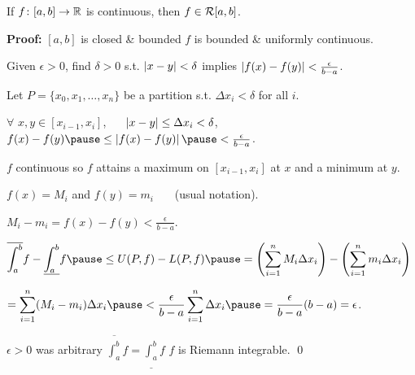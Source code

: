 \documentclass[10pt,aspectratio=149]{beamer}
\begin{document}
\begin{frame}

\begin{lemma}
If $f \colon [a,b] \to {\mathbb{R}}$ is continuous,
then $f \in {\mathcal{R}}[a,b]$.
\end{lemma}

\pause
\textbf{Proof:}
$[a,b]$ is closed \& bounded
\pause
\hfill\thus\hfill $f$ is bounded \&
uniformly continuous.

\pause
Given $\epsilon > 0$, find $\delta > 0$ s.t.
$\left\lvert {x-y} \right\rvert < \delta$ implies $\left\lvert {f(x)-f(y)} \right\rvert < \frac{\epsilon}{b-a}$.

\pause
Let $P = \{ x_0, x_1, \ldots, x_n \}$
be a partition s.t. $\Delta x_i < \delta$ for all $i$.


\pause
\medskip

$\forall$ $x, y \in [x_{i-1},x_i]$, ~~
$\left\lvert {x-y} \right\rvert \leq \Delta x_i < \delta$,
\pause
\wthus
$
f(x)-f(y)
\pause
\leq
\abs{f(x)-f(y)}
\pause
<
\frac{\epsilon}{b-a}$.

\pause
\medskip

$f$ continuous so 
$f$ attains a maximum on $[x_{i-1},x_i]$ at $x$ and
a minimum at $y$.

\pause
\thus \quad $f(x) = M_i$ and $f(y) = m_i$ ~~~(usual notation).

\pause
\medskip

\thus\quad
$M_i-m_i = f(x)-f(y) < \frac{\epsilon}{b-a}$.

\pause
\medskip

\thus\quad
$\displaystyle
\overline{\int_a^b} f - 
\underline{\int_a^b} f 
\pause
\leq
U(P,f) - L(P,f)
\pause
=
\left(
\sum_{i=1}^n
M_i \Delta x_i
\right)
-
\left(
\sum_{i=1}^n
m_i \Delta x_i
\right)
$

\pause
\medskip

\qquad\qquad
$\displaystyle
=
\sum_{i=1}^n
(M_i-m_i) \Delta x_i
\pause
<
\frac{\epsilon}{b-a}
\sum_{i=1}^n
\Delta x_i
\pause
=
\frac{\epsilon}{b-a} (b-a)
= \epsilon$.

\pause
\medskip

$\epsilon > 0$ was arbitrary
\pause
\wthus
$\overline{\int_a^b} f = \underline{\int_a^b} f$
\pause
\wthus
$f$ is Riemann integrable.
\qed

\end{frame}
\end{document}
